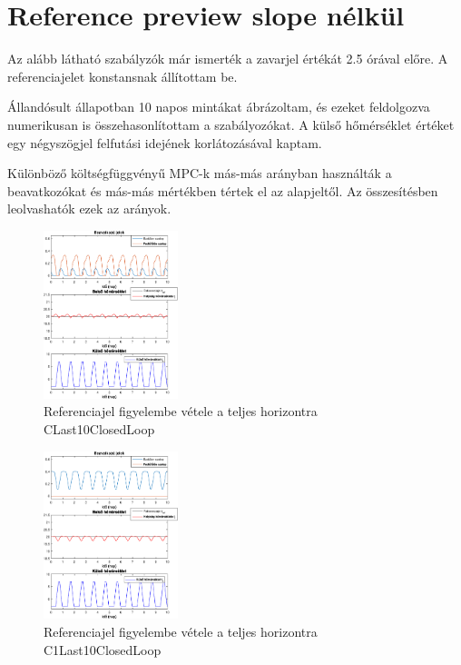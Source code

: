 
\section{Reference preview slope nélkül}

 
 Az alább látható szabályzók már ismerték a zavarjel értékát 2.5 órával előre. A referenciajelet konstansnak állítottam be.
 
 Állandósult állapotban 10 napos mintákat ábrázoltam, és ezeket feldolgozva numerikusan is összehasonlítottam a szabályozókat.
 A külső hőmérséklet értéket egy négyszögjel felfutási idejének korlátozásával kaptam.
 
 Különböző költségfüggvényű MPC-k más-más arányban használták a beavatkozókat és más-más mértékben tértek el az alapjeltől. Az összesítésben leolvashatók ezek az arányok.
 
\begin{figure}[H]
	\centering
	\includegraphics[width=0.35\textwidth, trim=0 0 0 0, clip,]{figures/onlab/NoSlope/CLast10ClosedLoop}
	\caption{Referenciajel figyelembe vétele a teljes horizontra CLast10ClosedLoop}
	\label{fig:onlab-refprev1}
\end{figure}

\begin{figure}[H]
\centering
\includegraphics[width=0.35\textwidth, trim=0 0 0 0, clip,]{figures/onlab/NoSlope/C1Last10ClosedLoop}
\caption{Referenciajel figyelembe vétele a teljes horizontra C1Last10ClosedLoop}
\label{fig:onlab-refprev2}
\end{figure}

